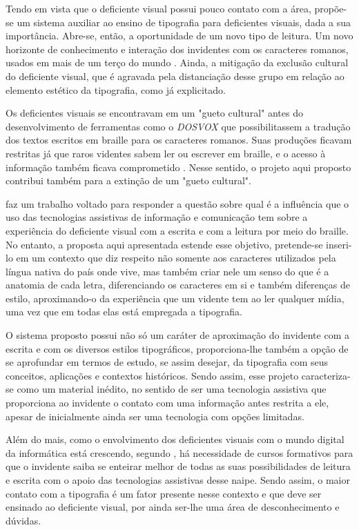 Tendo em vista que o deficiente visual possui pouco contato com a área, propõe-se um sistema auxiliar ao ensino de tipografia para deficientes visuais, dada a sua importância. Abre-se, então, a oportunidade de um novo tipo de leitura. Um novo horizonte de conhecimento e interação dos invidentes com os caracteres romanos, usados em mais de um terço do mundo . Ainda, a mitigação da exclusão cultural do deficiente visual, que é agravada pela distanciação desse grupo em relação ao elemento estético da tipografia, como já explicitado.

Os deficientes visuais se encontravam em um "gueto cultural" antes do desenvolvimento de ferramentas como o \textit{DOSVOX} que possibilitassem a tradução dos textos escritos em braille para os caracteres romanos. Suas produções ficavam restritas já que raros videntes sabem ler ou escrever em braille, e o acesso à informação também ficava comprometido . Nesse sentido, o projeto aqui proposto contribui também para a extinção de um "gueto cultural".

 faz um trabalho voltado para responder a questão sobre qual é a influência que o uso das tecnologias assistivas de informação e comunicação tem sobre a experiência do deficiente visual com a escrita e com a leitura por meio do braille. No entanto, a proposta aqui apresentada estende esse objetivo, pretende-se inseri-lo em um contexto que diz respeito não somente aos caracteres utilizados pela língua nativa do país onde vive, mas também criar nele um senso do que é a anatomia de cada letra, diferenciando os caracteres em si e também diferenças de estilo, aproximando-o da experiência que um vidente tem ao ler qualquer mídia, uma vez que em todas elas está empregada a tipografia.

O sistema proposto possui não só um caráter de aproximação do invidente com a escrita e com os diversos estilos tipográficos, proporciona-lhe também a opção de se aprofundar em termos de estudo, se assim desejar, da tipografia com seus conceitos, aplicações e contextos históricos. Sendo assim, esse projeto caracteriza-se como um material inédito, no sentido de ser uma tecnologia assistiva que proporciona ao invidente o contato com uma informação antes restrita a ele, apesar de inicialmente ainda ser uma tecnologia com opções limitadas.

Além do mais, como o envolvimento dos deficientes visuais com o mundo digital da informática está crescendo, segundo , há necessidade de cursos formativos para que o invidente saiba se enteirar melhor de todas as suas possibilidades de leitura e escrita com o apoio das tecnologias assistivas desse naipe. Sendo assim, o maior contato com a tipografia é um fator presente nesse contexto e que deve ser ensinado ao deficiente visual, por ainda ser-lhe uma área de desconhecimento e dúvidas.

